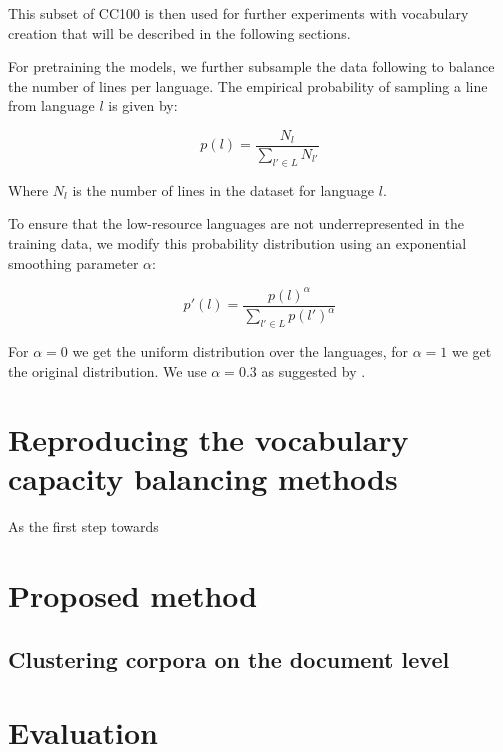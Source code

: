 
This subset of CC100 is then used for further experiments with vocabulary creation that will be described in the following sections.

For pretraining the models, we further subsample the data following \citet{conneau_unsupervised_2020-1} to balance the number of lines per language. The empirical probability of sampling a line from language $l$ is given by:

\begin{equation}
    p(l) = \frac{N_l}{\sum_{l' \in L} N_{l'}}
\end{equation}

Where $N_l$ is the number of lines in the dataset for language $l$.

To ensure that the low-resource languages are not underrepresented in the training data, we modify this probability distribution using an exponential smoothing parameter $\alpha$:

\begin{equation}
    p'(l) = \frac{p(l)^\alpha}{\sum_{l' \in L} p(l')^\alpha}
\end{equation}

For $\alpha = 0$ we get the uniform distribution over the languages, for $\alpha = 1$ we get the original distribution. We use $\alpha = 0.3$ as suggested by \citet{conneau_unsupervised_2020-1}.

\section{Reproducing the vocabulary capacity balancing methods}

As the first step towards

\section{Proposed method}

\subsection{Clustering corpora on the document level}

\section{Evaluation}

